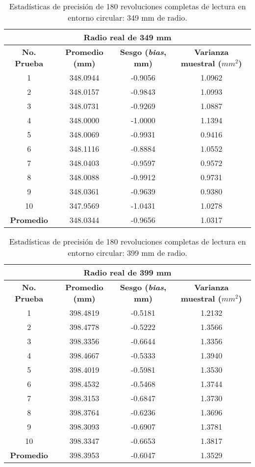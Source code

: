\begin{table}[H]
	\centering
	\begin{tabular}{|c|c|c|c|}
		\hline
		\multicolumn{4}{|c|}{\textbf{Radio real de 349 mm}} \\ \hline
		\textbf{No. Prueba} & \textbf{Promedio (mm)} & \textbf{Sesgo (\textit{bias}, mm)} & \textbf{Varianza muestral ($mm^2$)} \\ \hline
		1 & 348.0944 & -0.9056 & 1.0962 \\ 
		2 & 348.0157 & -0.9843 & 1.0993 \\ 
		3 & 348.0731 & -0.9269 & 1.0887 \\ 
		4 & 348.0000 & -1.0000 & 1.1394 \\ 
		5 & 348.0069 & -0.9931 & 0.9416 \\ 
		6 & 348.1116 & -0.8884 & 1.0552 \\ 
		7 & 348.0403 & -0.9597 & 0.9572 \\ 
		8 & 348.0088 & -0.9912 & 0.9731 \\ 
		9 & 348.0361 & -0.9639 & 0.9380 \\ 
		10 & 347.9569 & -1.0431 & 1.0278 \\ \hline
		\textbf{Promedio} & 348.0344 & -0.9656 & 1.0317 \\ \hline
	\end{tabular}
	\caption{Estadísticas de precisión de 180 revoluciones completas de lectura en entorno circular: 349 mm de radio.}
	\label{fig:tabla_dists5}
\end{table}

\begin{table}[H]
	\centering
	\begin{tabular}{|c|c|c|c|}
		\hline
		\multicolumn{4}{|c|}{\textbf{Radio real de 399 mm}} \\ \hline
		\textbf{No. Prueba} & \textbf{Promedio (mm)} & \textbf{Sesgo (\textit{bias}, mm)} & \textbf{Varianza muestral ($mm^2$)} \\ \hline
		1 & 398.4819 & -0.5181 & 1.2132 \\ 
		2 & 398.4778 & -0.5222 & 1.3566 \\ 
		3 & 398.3356 & -0.6644 & 1.3356 \\ 
		4 & 398.4667 & -0.5333 & 1.3940 \\ 
		5 & 398.4019 & -0.5981 & 1.3530 \\ 
		6 & 398.4532 & -0.5468 & 1.3744 \\ 
		7 & 398.3153 & -0.6847 & 1.3730 \\ 
		8 & 398.3764 & -0.6236 & 1.3696 \\ 
		9 & 398.3093 & -0.6907 & 1.3781 \\ 
		10 & 398.3347 & -0.6653 & 1.3817 \\ \hline
		\textbf{Promedio} & 398.3953 & -0.6047 & 1.3529 \\ \hline
	\end{tabular}
	\caption{Estadísticas de precisión de 180 revoluciones completas de lectura en entorno circular: 399 mm de radio.}
	\label{fig:tabla_dists6}
\end{table}

